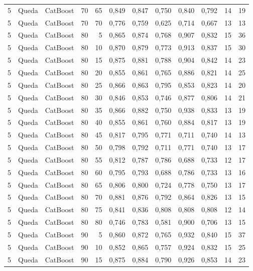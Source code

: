 \begin{longtable}{ccclrrrrrrrr}
5 & Queda & CatBoost & 70 & 65 & 0,849 & 0,847 & 0,750 & 0,840 & 0,792 & 14 & 19 \\
5 & Queda & CatBoost & 70 & 70 & 0,776 & 0,759 & 0,625 & 0,714 & 0,667 & 13 & 13 \\
5 & Queda & CatBoost & 80 & 5 & 0,865 & 0,874 & 0,768 & 0,907 & 0,832 & 15 & 36 \\
5 & Queda & CatBoost & 80 & 10 & 0,870 & 0,879 & 0,773 & 0,913 & 0,837 & 15 & 30 \\
5 & Queda & CatBoost & 80 & 15 & 0,875 & 0,881 & 0,788 & 0,904 & 0,842 & 14 & 23 \\
5 & Queda & CatBoost & 80 & 20 & 0,855 & 0,861 & 0,765 & 0,886 & 0,821 & 14 & 25 \\
5 & Queda & CatBoost & 80 & 25 & 0,866 & 0,863 & 0,795 & 0,853 & 0,823 & 14 & 20 \\
5 & Queda & CatBoost & 80 & 30 & 0,846 & 0,853 & 0,746 & 0,877 & 0,806 & 14 & 21 \\
5 & Queda & CatBoost & 80 & 35 & 0,866 & 0,882 & 0,750 & 0,938 & 0,833 & 13 & 19 \\
5 & Queda & CatBoost & 80 & 40 & 0,855 & 0,861 & 0,760 & 0,884 & 0,817 & 13 & 19 \\
5 & Queda & CatBoost & 80 & 45 & 0,817 & 0,795 & 0,771 & 0,711 & 0,740 & 14 & 13 \\
5 & Queda & CatBoost & 80 & 50 & 0,798 & 0,792 & 0,711 & 0,771 & 0,740 & 13 & 17 \\
5 & Queda & CatBoost & 80 & 55 & 0,812 & 0,787 & 0,786 & 0,688 & 0,733 & 12 & 17 \\
5 & Queda & CatBoost & 80 & 60 & 0,795 & 0,793 & 0,688 & 0,786 & 0,733 & 13 & 16 \\
5 & Queda & CatBoost & 80 & 65 & 0,806 & 0,800 & 0,724 & 0,778 & 0,750 & 13 & 17 \\
5 & Queda & CatBoost & 80 & 70 & 0,881 & 0,876 & 0,792 & 0,864 & 0,826 & 13 & 15 \\
5 & Queda & CatBoost & 80 & 75 & 0,841 & 0,836 & 0,808 & 0,808 & 0,808 & 12 & 14 \\
5 & Queda & CatBoost & 80 & 80 & 0,746 & 0,783 & 0,581 & 0,900 & 0,706 & 13 & 15 \\
5 & Queda & CatBoost & 90 & 5 & 0,860 & 0,872 & 0,765 & 0,932 & 0,840 & 15 & 37 \\
5 & Queda & CatBoost & 90 & 10 & 0,852 & 0,865 & 0,757 & 0,924 & 0,832 & 15 & 25 \\
5 & Queda & CatBoost & 90 & 15 & 0,875 & 0,884 & 0,790 & 0,926 & 0,853 & 14 & 23 \\

\end{longtable}

